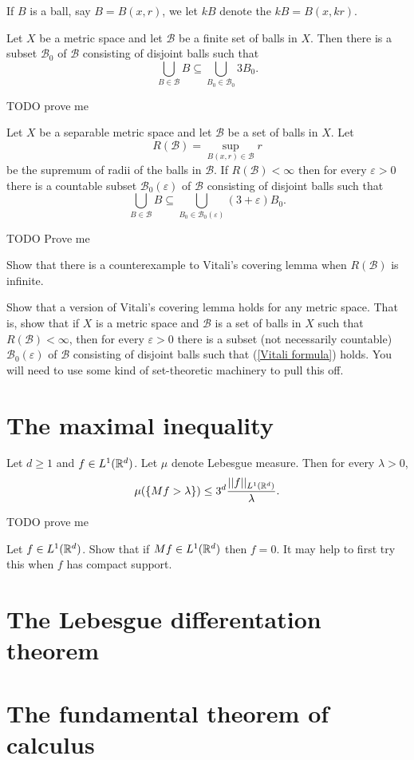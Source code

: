 \begin{definition}
If $B$ is a ball, say $B = B(x, r)$, we let $kB$ denote the  $kB = B(x, kr)$.
\end{definition}
\begin{lemma}
Let $X$ be a metric space and let $\mathcal B$ be a finite set of balls in $X$. Then there is a subset $\mathcal B_0$ of $\mathcal B$ consisting of disjoint balls such that
\[\bigcup_{B \in \mathcal B} B \subseteq \bigcup_{B_0 \in \mathcal B_0} 3B_0.\]
\end{lemma}
TODO prove me
\begin{theorem}
Let $X$ be a separable metric space and let $\mathcal B$ be a set of balls in $X$. Let
\[R(\mathcal B) = \sup_{B(x, r) \in \mathcal B} r\]
be the supremum of radii of the balls in $\mathcal B$. If $R(\mathcal B) < \infty$ then for every $\varepsilon > 0$ there is a countable subset $\mathcal B_0(\varepsilon)$ of $\mathcal B$ consisting of disjoint balls such that
\begin{equation}
\label{Vitali formula}
\bigcup_{B \in \mathcal B} B \subseteq \bigcup_{B_0 \in \mathcal B_0(\varepsilon)} (3 + \varepsilon)B_0.
\end{equation}
\end{theorem}
TODO Prove me

\begin{exercise}
Show that there is a counterexample to Vitali's covering lemma when $R(\mathcal B)$ is infinite.
\end{exercise}

\begin{exercise}
Show that a version of Vitali's covering lemma holds for any metric space.
That is, show that if $X$ is a metric space and $\mathcal B$ is a set of balls in $X$ such that $R(\mathcal B) < \infty$, then for every $\varepsilon > 0$ there is a subset (not necessarily countable) $\mathcal B_0(\varepsilon)$ of $\mathcal B$ consisting of disjoint balls such that (\ref{Vitali formula}) holds.
You will need to use some kind of set-theoretic machinery to pull this off.
\end{exercise}

\section{The maximal inequality}

\begin{theorem}
Let $d \geq 1$ and $f \in L^1(\mathbb{R}^d)$. Let $\mu$ denote Lebesgue measure. Then for every $\lambda > 0$,
\[\mu(\{Mf > \lambda\}) \leq 3^{d} \frac{||f||_{L^1(\mathbb{R}^d)}}{\lambda}.\]
\end{theorem}
TODO prove me

\begin{exercise}
Let $f \in L^1(\mathbb{R}^d)$.
Show that if $Mf \in L^1(\mathbb{R}^d)$ then $f = 0$.
It may help to first try this when $f$ has compact support.
\end{exercise}

\section{The Lebesgue differentation theorem}

\section{The fundamental theorem of calculus}
